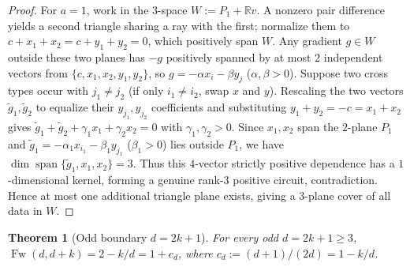 \documentclass[11pt]{article}
\theoremstyle{plain}
\newtheorem{theorem}{Theorem}
\theoremstyle{definition}
\theoremstyle{remark}
\DeclareMathOperator{\Fw}{Fw}
\DeclareMathOperator{\spn}{span}
\begin{document}
\begin{proof}
For $a = 1$, work in the $3$-space $W := P_1 + \mathbb{R}v$.
A nonzero pair difference yields a second triangle sharing a ray with the first; normalize them to $c + x_1 + x_2 = c + y_1 + y_2 = 0$, which positively span $W$.
Any gradient $g \in W$ outside these two planes has $-g$ positively spanned by at most $2$ independent vectors from $\{c, x_1, x_2, y_1, y_2\}$, so $g = -\alpha x_i - \beta y_j$ ($\alpha, \beta > 0$).
Suppose two cross types occur with $j_1 \neq j_2$ (if only $i_1 \neq i_2$, swap $x$ and $y$).
Rescaling the two vectors $\tilde{g}_1, \tilde{g}_2$ to equalize their $y_{j_1}, y_{j_2}$ coefficients and substituting $y_1 + y_2 = -c = x_1 + x_2$ gives $\tilde{g}_1 + \tilde{g}_2 + \gamma_1 x_1 + \gamma_2 x_2 = 0$ with $\gamma_1, \gamma_2 > 0$.
Since $x_1, x_2$ span the $2$-plane $P_1$ and $\tilde{g}_1 = -\alpha_1 x_{i_1} - \beta_1 y_{j_1}$ ($\beta_1 > 0$) lies outside $P_1$, we have $\dim\spn\{\tilde{g}_1, x_1, x_2\} = 3$.
Thus this $4$-vector strictly positive dependence has a $1$-dimensional kernel, forming a genuine rank-$3$ positive circuit, contradiction.
Hence at most one additional triangle plane exists, giving a $3$-plane cover of all data in $W$.
\end{proof}

\begin{theorem}[Odd boundary $d = 2k + 1$]\label{thm:odd}
For every odd $d = 2k + 1 \ge 3$, $\Fw(d, d + k) = 2 - k/d = 1 + c_d$, where $c_d := (d + 1)/(2d) = 1 - k/d$.
\end{theorem}
\end{document}

